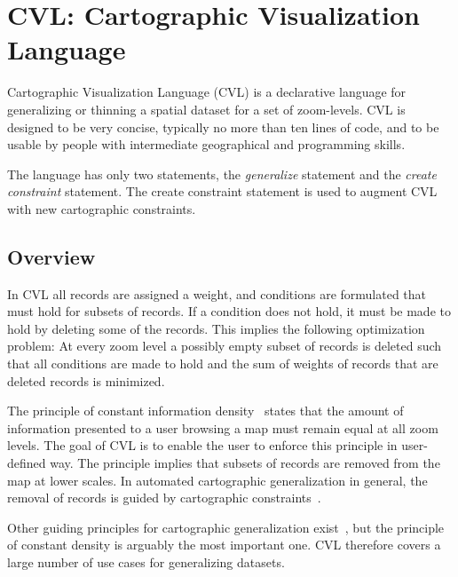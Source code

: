 \section{CVL: Cartographic Visualization Language}
\label{sec:cvl-language}
Cartographic Visualization Language (CVL) is a declarative language for generalizing or thinning a spatial dataset for a set of zoom-levels. CVL is designed to be very concise, typically no more than ten lines of code, and to be usable by people with intermediate geographical and programming skills.


The language has only two statements, the \emph{generalize} statement and the \emph{create constraint} statement. The create constraint statement is used to augment CVL with new cartographic constraints.

\subsection{Overview}


In CVL all records are assigned a weight, and conditions are formulated that must hold for subsets of records. If a condition does not hold, it must be made to hold by deleting some of the records. This implies the following optimization problem: At every zoom level a possibly empty subset of records is deleted such that all conditions are made to hold and the sum of weights of records that are deleted records is minimized.

The principle of constant information density~\cite{toepfer} states that the amount of information presented to a user browsing a map must remain equal at all zoom levels. The goal of CVL is to enable the user to enforce this principle in user-defined way. The principle implies that subsets of records are removed from the map at lower scales. In automated cartographic generalization in general, the removal of records is guided by cartographic constraints~\cite{something}.

Other guiding principles for cartographic generalization exist~\cite{something}, but the principle of constant density is arguably the most important one. CVL therefore covers a large number of use cases for generalizing datasets.



